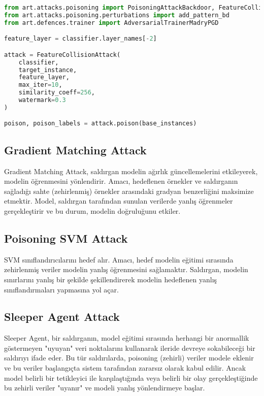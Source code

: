 \begin{lstlisting}[language=Python]
from art.attacks.poisoning import PoisoningAttackBackdoor, FeatureCollisionAttack
from art.attacks.poisoning.perturbations import add_pattern_bd
from art.defences.trainer import AdversarialTrainerMadryPGD

feature_layer = classifier.layer_names[-2]

attack = FeatureCollisionAttack(
    classifier, 
    target_instance, 
    feature_layer,
    max_iter=10, 
    similarity_coeff=256, 
    watermark=0.3
)

poison, poison_labels = attack.poison(base_instances)
\end{lstlisting}

\newpage

\subsection{Gradient Matching Attack}

Gradient Matching Attack, saldırgan modelin ağırlık güncellemelerini etkileyerek, modelin öğrenmesini yönlendirir. Amacı, hedeflenen örnekler ve saldırganın sağladığı sahte (zehirlenmiş) örnekler arasındaki gradyan benzerliğini maksimize etmektir. Model, saldırgan tarafından sunulan verilerde yanlış öğrenmeler gerçekleştirir ve bu durum, modelin doğruluğunu etkiler.

\newpage

\subsection{Poisoning SVM Attack}

SVM sınıflandırıcılarını hedef alır. Amacı, hedef modelin eğitimi sırasında zehirlenmiş veriler modelin yanlış öğrenmesini sağlamaktır. Saldırgan, modelin sınırlarını yanlış bir şekilde şekillendirerek modelin hedeflenen yanlış sınıflandırmaları yapmasına yol açar. 

\newpage

\subsection{Sleeper Agent Attack}

Sleeper Agent, bir saldırganın, model eğitimi sırasında herhangi bir anormallik göstermeyen "uyuyan" veri noktalarını kullanarak ileride devreye sokabileceği bir saldırıyı ifade eder. Bu tür saldırılarda, poisoning (zehirli) veriler modele eklenir ve bu veriler başlangıçta sistem tarafından zararsız olarak kabul edilir. Ancak model belirli bir tetikleyici ile karşılaştığında veya belirli bir olay gerçekleştiğinde bu zehirli veriler "uyanır" ve modeli yanlış yönlendirmeye başlar.

\newpage